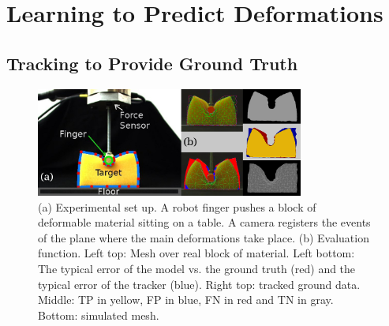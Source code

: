 \documentclass[journal]{IEEEtran}
\newcommand{\comment}[1]{{\color{red} #1}}
\begin{document}
\section{\comment{Learning to Predict Deformations}}
\label{sec:learning}

\subsection{Tracking to Provide Ground Truth}

\begin{figure}[!t]
\centering
\includegraphics[width=88mm]{arrio2}
\caption{(a) Experimental set up.  A robot finger pushes a block of deformable material sitting on a table.  A camera registers the events of the plane where the main deformations take place.  (b) Evaluation function.  Left top: Mesh over real block of material.  Left bottom: The typical error of the model vs. the ground truth (red) and the typical error of the tracker (blue).  Right top: tracked ground data.  Middle: TP in yellow, FP in blue, FN in red and TN in gray.  Bottom: simulated mesh. }
\label{fig:scene}
\end{figure}
\end{document}
